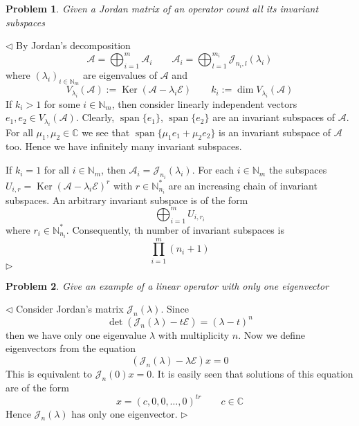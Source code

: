 \documentclass[12pt]{article}
\newtheorem{problem}{Problem}[subsection]
\newenvironment{solution}{\par $\triangleleft$}{$\triangleright$}
\begin{document}
\begin{problem} Given a Jordan matrix of an operator count all its invariant
subspaces
\end{problem}
\begin{solution} By Jordan's decomposition
    $$
        \mathcal{A}=\bigoplus_{i=1}^m \mathcal{A}_i\qquad
        \mathcal{A}_i=\bigoplus_{l=1}^{m_i} \mathcal{J}_{n_i,l}(\lambda_i)
    $$
    where ${(\lambda_i)}_{i\in\mathbb{N}_m}$ are eigenvalues of $\mathcal{A}$
    and
    $$
        V_{\lambda_i}(\mathcal{A})
        :=\operatorname{Ker}(\mathcal{A}-\lambda_i\mathcal{E})
        \qquad
        k_i:=\dim V_{\lambda_i}(\mathcal{A})
    $$
    If $k_i>1$ for some $i\in\mathbb{N}_m$, then consider linearly independent
    vectors $e_1,e_2\in V_{\lambda_i}(\mathcal{A})$. Clearly,
    $\operatorname{span}\{e_1\}$, $\operatorname{span}\{e_2\}$ are an invariant
    subspaces of $\mathcal{A}$. For all $\mu_1,\mu_2\in\mathbb{C}$ we see that
    $\operatorname{span}\{\mu_1e_1+\mu_2e_2\}$ is an invariant subspace of
    $\mathcal{A}$ too. Hence we have infinitely many invariant subspaces.

    If $k_i=1$ for all $i\in\mathbb{N}_m$, then
    $\mathcal{A}_i=\mathcal{J}_{n_i}(\lambda_i)$. For each $i\in\mathbb{N}_m$
    the subspaces
    $U_{i,r}=\operatorname{Ker}{(\mathcal{A}-\lambda_i\mathcal{E})}^r$ with
    $r\in\mathbb{N}_{n_i}^*$ are an increasing chain of invariant subspaces. An
    arbitrary invariant subspace is of the form
    $$
        \bigoplus_{i=1}^m U_{i,r_i}
    $$
    where $r_i\in\mathbb{N}_{n_i}^*$. Consequently, th number of invariant
    subspaces is
    $$
        \prod_{i=1}^m(n_i+1)
    $$
\end{solution}


\begin{problem} Give an example of a linear operator with only one eigenvector
\end{problem}
\begin{solution} Consider Jordan's matrix $\mathcal{J}_n(\lambda)$. Since
    $$
        \det(\mathcal{J}_n(\lambda)-t\mathcal{E})={(\lambda-t)}^n
    $$
    then we have only one eigenvalue $\lambda$ with multiplicity $n$. Now we
    define eigenvectors from the equation
    $$
        (\mathcal{J}_n(\lambda)-\lambda\mathcal{E})x=0
    $$
    This is equivalent to $\mathcal{J}_n(0)x=0$. It is easily seen that
    solutions of this equation are of the form
    $$
        x={( c, 0, 0, \ldots, 0 )}^{tr}\qquad c\in\mathbb{C}
    $$
    Hence $\mathcal{J}_n(\lambda)$ has only one eigenvector.
\end{solution}
\end{document}
